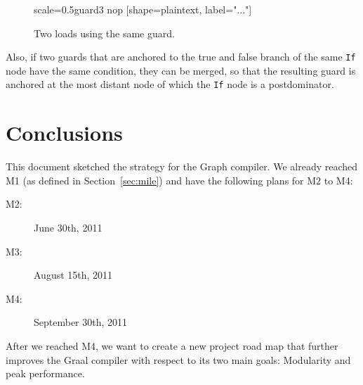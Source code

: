 \documentclass[twocolumn]{svjour3}
\begin{document}
\begin{figure}[h]
  \centering
\begin{digraphenv}{scale=0.5}{guard3}
    nop [shape=plaintext, label="..."]
\end{digraphenv}
  \caption{Two loads using the same guard.}
  \label{fig:guard3}
\end{figure}

Also, if two guards that are anchored to the true and false branch of the same \texttt{If} node have the same condition, they can be merged, so that the resulting guard is anchored at the most distant node of which the \texttt{If} node is a postdominator.

\section{Conclusions}
\label{sec:conclusions}
This document sketched the strategy for the Graph compiler.
We already reached M1 (as defined in Section~\ref{sec:mile}) and have the following plans for M2 to M4:
\begin{description}
\item[M2:] June 30th, 2011
\item[M3:] August 15th, 2011
\item[M4:] September 30th, 2011
\end{description}
After we reached M4, we want to create a new project road map that further improves the Graal compiler with respect to its two main goals: Modularity and peak performance.
\end{document}
